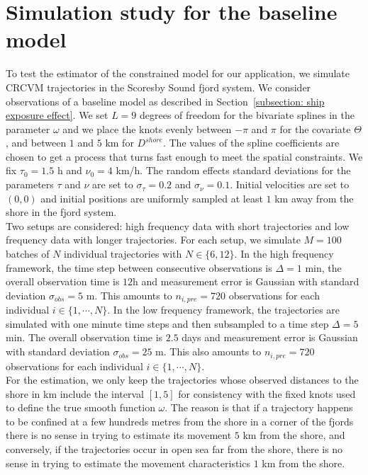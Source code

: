 \documentclass[aoas]{imsart}
\theoremstyle{definition}
\theoremstyle{remark}
\theoremstyle{remark}
\newcommand {\1}{\mathbb{1}}
\begin{document}
\section{Simulation study for the baseline model}
\label{section: simulation constrained motion}
To test the estimator of the constrained model for our application, we simulate CRCVM trajectories in the Scoresby Sound fjord system. We consider observations of a baseline model as described in Section~\ref{subsection: ship exposure effect}. We set $L=9$ degrees of freedom for the bivariate splines in the parameter $\omega$ and  we place the knots evenly between $-\pi$ and $\pi$ for the covariate $\Theta$, and between $1$ and $5$ km for $D^{shore}$. The values of the spline coefficients are chosen to get a process that turns fast enough to meet the spatial constraints. We fix $\tau_0=1.5$ h and $\nu_0=4$ km/h. The random effects standard deviations for the parameters $\tau$ and $\nu$ are set to $\sigma_{\tau}=0.2$ and $\sigma_{\nu}=0.1$. Initial velocities are set to $(0,0)$ and initial positions are uniformly sampled at least $1$ km away from the shore in the fjord system. \\

Two setups are considered: high frequency data with short trajectories and low frequency data with longer trajectories. For each setup, we simulate $M=100$ batches of $N$ individual trajectories with $N \in \{6,12\}$. In the high frequency framework, the time step between consecutive observations is $\Delta=1$ min, the overall observation time is $12$h and measurement error is Gaussian with standard deviation $\sigma_{obs}=5$ m. This amounts to $n_{i,pre}=720$ observations for each individual $i \in \{1,\cdots,N\}$. In the low frequency framework, the trajectories are simulated with one minute time steps and then subsampled to a time step $\Delta=5$ min. The overall observation time is $2.5$ days and measurement error is Gaussian with standard deviation $\sigma_{obs}=25$ m. This also amounts to $n_{i,pre}=720$ observations for each individual $i \in \{1,\cdots,N\}$.\\

For the estimation, we only keep the trajectories whose observed distances to the shore in km include the interval $[1,5]$ for consistency with the fixed knots used to define the true smooth function $\omega$. The reason is that if a trajectory happens to be confined at a few hundreds metres from the shore in a corner of the fjords there is no sense in trying to estimate its movement $5$ km from the shore, and conversely, if the trajectories occur in open sea far from the shore, there is no sense in trying to estimate the movement characteristics $1$ km from the shore.\\
\end{document}
